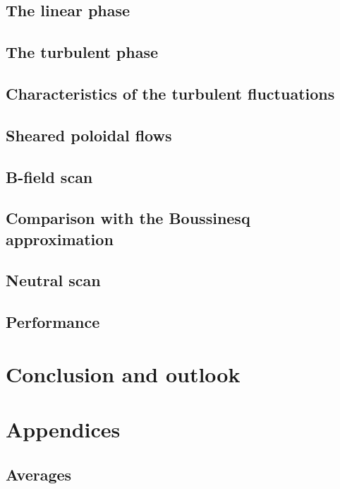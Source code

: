 \documentclass[12pt,a4paper,oneside,openright]{report} %
\begin{document}
\chapter{The linear phase}
\label{chap:linear}

\chapter{The turbulent phase}
\label{chap:satTurb}

\chapter{Characteristics of the turbulent fluctuations}
\label{chap:charTurb}



\chapter{Sheared poloidal flows}
\label{chap:poloidal}

\chapter{B-field scan}
\label{chap:BFScan}

\chapter{Comparison with the Boussinesq approximation}
\label{chap:compBouss}

\chapter{Neutral scan}
\label{chap:neutScan}

\chapter{Performance}
\label{chap:performance}


\part{Conclusion and outlook}
\label{part:concl}



\part{Appendices}
\label{part:app}
\appendix
\chapter{Averages}
\label{app:averages}

\end{document}
